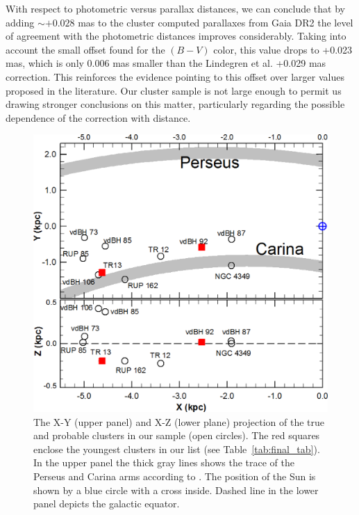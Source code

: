 \documentclass[draft]{aa}
\begin{document}
With respect to photometric versus parallax distances, we can conclude that by
adding $\sim+0.028$ mas to the cluster computed parallaxes from Gaia DR2
the level of agreement with the photometric distances improves considerably.
Taking into account the small offset found for the $(B-V)$ color, this
value drops to +0.023 mas, which is only 0.006 mas smaller than the
Lindegren et al. +0.029 mas correction.
This reinforces the evidence pointing to this offset over larger
values proposed in the literature. Our cluster sample is not large enough
to permit us drawing stronger conclusions on this matter, particularly
regarding the possible dependence of the correction with distance.


\begin{figure}[ht]
    \centering
    \includegraphics[width=\hsize]{../figs/xy_xz.png}
\caption{The X-Y (upper panel) and X-Z (lower plane) projection of the true and
probable clusters in our sample (open circles). The red squares
enclose the youngest clusters in our list (see Table~\ref{tab:final_tab}).
In the upper panel the thick gray lines shows the trace of the Perseus and
Carina arms according to \cite{valle_2005}.
The position of the Sun is shown by a blue circle with a cross inside.
Dashed line in the lower panel depicts the galactic equator.}
\label{fig68}
\end{figure}
\end{document}
